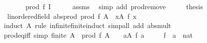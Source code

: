 \begin{isabellebody}
\ \ \isamarkupfalse%
\ \isamarkupfalse%
\ {\isachardoublequoteopen}{\isasymdots}\ {\isacharequal}{\kern0pt}\ prod\ f\ I{\isachardoublequoteclose}\isanewline
\ \ \ \ \isamarkupfalse%
\ assms\ \isamarkupfalse%
\ {\isacharparenleft}{\kern0pt}simp\ add{\isacharcolon}{\kern0pt}\ prod{\isachardot}{\kern0pt}remove{\isacharparenright}{\kern0pt}\isanewline
\ \ \isamarkupfalse%
\ \isamarkupfalse%
\ {\isacharquery}{\kern0pt}thesis\ \isacommand{{\isachardot}{\kern0pt}}\isamarkupfalse%
\isanewline
{}\isamarkupfalse%
%
\endisatagproof
{\isafoldproof}%
%
\isadelimproof
\isanewline
%
\endisadelimproof
\isanewline
{}\isamarkupfalse%
\ {\isacharparenleft}{\kern0pt}\ linordered{\isacharunderscore}{\kern0pt}field{\isacharparenright}{\kern0pt}\ abs{\isacharunderscore}{\kern0pt}prod{\isacharcolon}{\kern0pt}\ {\isachardoublequoteopen}{\isasymbar}prod\ f\ A{\isasymbar}\ {\isacharequal}{\kern0pt}\ {\isacharparenleft}{\kern0pt}{\isasymProd}x{\isasymin}A{\isachardot}{\kern0pt}\ {\isasymbar}f\ x{\isasymbar}{\isacharparenright}{\kern0pt}{\isachardoublequoteclose}\isanewline
%
\isadelimproof
\ \ %
\endisadelimproof
%
\isatagproof
{}\isamarkupfalse%
\ {\isacharparenleft}{\kern0pt}induct\ A\ rule{\isacharcolon}{\kern0pt}\ infinite{\isacharunderscore}{\kern0pt}finite{\isacharunderscore}{\kern0pt}induct{\isacharparenright}{\kern0pt}\ {\isacharparenleft}{\kern0pt}simp{\isacharunderscore}{\kern0pt}all\ add{\isacharcolon}{\kern0pt}\ abs{\isacharunderscore}{\kern0pt}mult{\isacharparenright}{\kern0pt}%
\endisatagproof
{\isafoldproof}%
%
\isadelimproof
\isanewline
%
\endisadelimproof
\isanewline
{}\isamarkupfalse%
\ prod{\isacharunderscore}{\kern0pt}eq{\isacharunderscore}{\kern0pt}{}{\isacharunderscore}{\kern0pt}iff\ {\isacharbrackleft}{\kern0pt}simp{\isacharbrackright}{\kern0pt}{\isacharcolon}{\kern0pt}\ {\isachardoublequoteopen}finite\ A\ {\isasymLongrightarrow}\ prod\ f\ A\ {\isacharequal}{\kern0pt}\ {}\ {\isasymlongleftrightarrow}\ {\isacharparenleft}{\kern0pt}{\isasymforall}a{\isasymin}A{\isachardot}{\kern0pt}\ f\ a\ {\isacharequal}{\kern0pt}\ {}{\isacharparenright}{\kern0pt}{\isachardoublequoteclose}\isanewline
\ \ \ f\ {\isacharcolon}{\kern0pt}{\isacharcolon}{\kern0pt}\ {\isachardoublequoteopen}{\isacharprime}{\kern0pt}a\ {\isasymRightarrow}\ nat{\isachardoublequoteclose}\isanewline
%
\isadelimproof
\ \ %
\endisadelimproof
%
\isatagproof
{}\isamarkupfalse%

\end{isabellebody}
